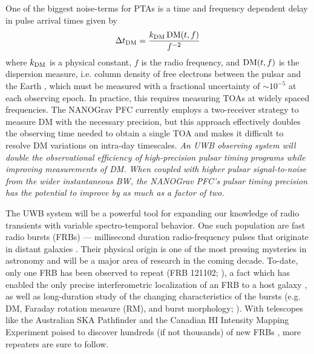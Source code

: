 \documentclass[10pt]{myNSF}
\begin{document}
One of the biggest noise-terms for PTAs is a time and frequency
dependent delay in pulse arrival times given by
\begin{equation}
  \Delta t_{\rm DM} = \frac{k_{\rm DM} \, \textrm{DM}(t,f)}{f^{-2}}
\end{equation}
where $k_{\rm DM}$ is a physical constant, $f$ is the radio frequency,
and $\textrm{DM}(t,f)$ is the dispersion measure, i.e. column density of free
electrons between the pulsar and the Earth \citep[e.g.][]{lk12}, which
must be measured with a fractional uncertainty of $\sim 10^{-5}$ at
each observing epoch.  In practice, this requires measuring TOAs at
widely spaced frequencies.  The NANOGrav PFC currently employs a
two-receiver strategy to measure DM with the necessary precision, but
this approach effectively doubles the observing time needed to obtain
a single TOA and makes it difficult to resolve DM variations on
intra-day timescales.  \emph{An UWB observing system will double the
  observational efficiency of high-precision pulsar timing programs
  while improving measurements of DM.  When coupled with higher pulsar
  signal-to-noise from the wider instantaneous BW, the NANOGrav PFC's
  pulsar timing precision has the potential to improve by as much as a
  factor of two.}


 The UWB system will be a powerful tool
for expanding our knowledge of radio transients with variable
spectro-temporal behavior.  One such population are fast radio bursts
(FRBs) --- millisecond duration radio-frequency pulses that originate
in distant galaxies \citep{lbm+07,tsb+13}.  Their physical origin is
one of the most pressing mysteries in astronomy and will be a major
area of research in the coming decade.  To-date, only one FRB has been
observed to repeat (FRB 121102; \cite{sch+14,ssh+16a}), a fact which
has enabled the only precise interferometric localization of an FRB to
a host galaxy \citep{clw+17,tbc+17}, as well as long-duration study of
the changing characteristics of the bursts (e.g. DM, Faraday rotation
measure (RM), and burst morphology; \cite{msh+18}).  With telescopes
like the Australian SKA Pathfinder and the Canadian H{\sc I} Intensity
Mapping Experiment poised to discover hundreds (if not thousands) of
new FRBs \citep{smb+18,chime18}, more repeaters are sure to follow.
\end{document}
